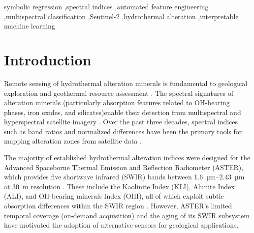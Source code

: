 \documentclass[preprint,authoryear,number]{elsarticle}
\begin{document}
\begin{frontmatter}
\begin{keyword}
symbolic regression \sep spectral indices \sep automated feature engineering \sep multispectral classification \sep Sentinel-2 \sep hydrothermal alteration \sep interpretable machine learning
\end{keyword}

\end{frontmatter}


\section{Introduction}
\label{sec:introduction}

Remote sensing of hydrothermal alteration minerals is fundamental to geological exploration and geothermal resource assessment \citep{Sabins1999,vanderMeer2012,Pour2018}. The spectral signatures of alteration minerals (particularly absorption features related to OH-bearing phases, iron oxides, and silicates)enable their detection from multispectral and hyperspectral satellite imagery \citep{Hunt1977,Clark1999}. Over the past three decades, spectral indices such as band ratios and normalized differences have been the primary tools for mapping alteration zones from satellite data \citep{Ninomiya2005,Mars2010}.

The majority of established hydrothermal alteration indices were designed for the Advanced Spaceborne Thermal Emission and Reflection Radiometer (ASTER), which provides five shortwave infrared (SWIR) bands between \SIrange{1.6}{2.43}{\micro\meter} at \SI{30}{\meter} resolution \citep{Ninomiya2005,Mars2006}. These include the Kaolinite Index (KLI), Alunite Index (ALI), and OH-bearing minerals Index (OHI), all of which exploit subtle absorption differences within the SWIR region \citep{Ninomiya2005}. However, ASTER's limited temporal coverage (on-demand acquisition) and the aging of its SWIR subsystem have motivated the adoption of alternative sensors for geological applications.
\end{document}
